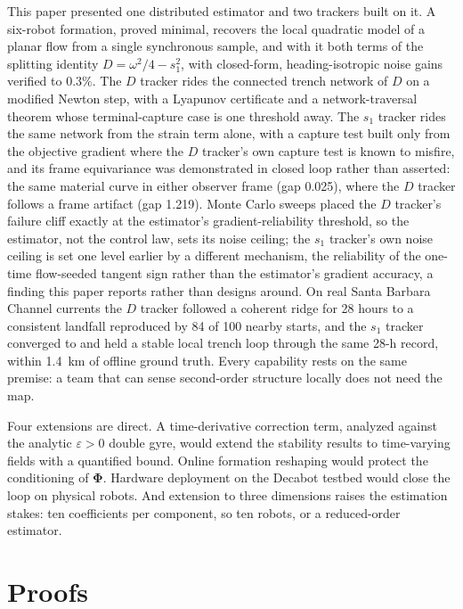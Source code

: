 \documentclass[lettersize,journal]{IEEEtran}
\begin{document}
This paper presented one distributed estimator and two trackers built
on it. A six-robot formation, proved minimal, recovers the local
quadratic model of a planar flow from a single synchronous sample, and
with it both terms of the splitting identity $D = \omega^2/4 - s_1^2$,
with closed-form, heading-isotropic noise gains verified to $0.3\%$.
The $D$ tracker rides the connected trench network of $D$ on a modified
Newton step, with a Lyapunov certificate and a network-traversal
theorem whose terminal-capture case is one threshold away. The $s_1$
tracker rides the same network from the strain term alone, with a
capture test built only from the objective gradient where the $D$
tracker's own capture test is known to misfire, and its frame
equivariance was demonstrated in closed loop rather than asserted: the
same material curve in either observer frame (gap 0.025), where the $D$
tracker follows a frame artifact (gap 1.219). Monte Carlo sweeps placed
the $D$ tracker's failure cliff exactly at the estimator's
gradient-reliability threshold, so the estimator, not the control law,
sets its noise ceiling; the $s_1$ tracker's own noise ceiling is set
one level earlier by a different mechanism, the reliability of the
one-time flow-seeded tangent sign rather than the estimator's gradient
accuracy, a finding this paper reports rather than designs around. On
real Santa Barbara Channel currents the $D$ tracker followed a coherent
ridge for 28 hours to a consistent landfall reproduced by 84 of 100
nearby starts, and the $s_1$ tracker converged to and held a stable
local trench loop through the same 28-h record, within 1.4~km of
offline ground truth. Every capability rests on the same premise: a
team that can sense second-order structure locally does not need the
map.

Four extensions are direct. A time-derivative correction term,
analyzed against the analytic $\varepsilon > 0$ double gyre, would
extend the stability results to time-varying fields with a quantified
bound. Online formation reshaping would protect the conditioning of
$\boldsymbol{\Phi}$. Hardware deployment on the Decabot testbed would
close the loop on physical robots. And extension to three dimensions
raises the estimation stakes: ten coefficients per component, so ten
robots, or a reduced-order estimator.

\appendices

\section{Proofs}
\label{app:proofs}
\end{document}
